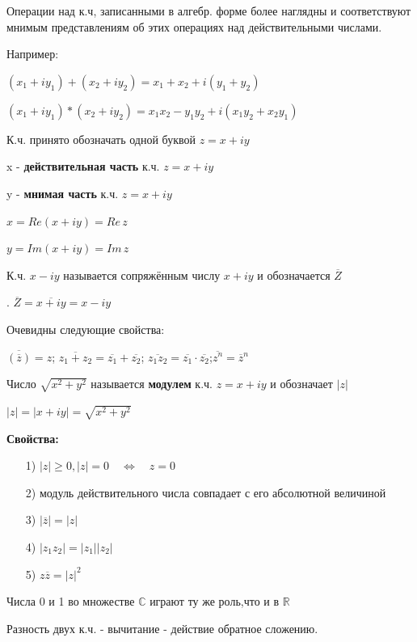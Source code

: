 \documentclass[a4paper, 12pt]{report}
\begin{document}
 Операции над к.ч, записанными в алгебр. форме более наглядны и соответствуют мнимым представлениям об этих операциях над действительными числами. 
  \par\bigskip
 Например:
  \par\bigskip
 \quad \quad $(x_1+iy_1) + (x_2+iy_2) = x_1+x_2+i(y_1+y_2)$
  \par\bigskip
 \quad \quad $(x_1+iy_1)*(x_2+iy_2) = x_1x_2-y_1y_2+i(x_1y_2+x_2y_1)$  
  \par\bigskip
 К.ч. принято обозначать одной буквой $z = x+iy$
\par x - \textbf{действительная часть} к.ч. $z = x+iy$
 \par y - \textbf{мнимая часть} к.ч. $z = x+iy$ 
   \par\bigskip
 \quad \quad $x=Re(x+iy)=Re\, z$
   \par\bigskip
 \quad \quad $y=Im(x+iy)=Im\, z$
   \par\bigskip
 К.ч. $x-iy$ называется сопряжённым числу $x+iy$ и обозначается $\overline{Z}$
   \par\bigskip.
 \quad \quad $\overline{Z} = \overline{x+iy} = x-iy$
    \par\bigskip
 Очевидны следующие свойства:
   \par\bigskip
 \quad \quad $\overline{(\overline{z})} = z$; \quad $\overline{z_1+z_2}=\overline{z_1}+\overline{z_2}$; \quad $\overline{z_1z_2}={\overline{z_1}} \cdot {\overline{z_2}}$;\quad $\overline{z^n}=\overline{z}^n$   
   \par\bigskip
 Число $\sqrt{x^2+y^2}$ называется \textbf{модулем} к.ч. $z=x+iy$ и обозначает $|z|$   
   \par\bigskip
 \quad \quad $|z| = |x+iy| = \sqrt{x^2+y^2}$
   \par\bigskip
 \textbf{Свойства:}
\begin{enumerate}
\item[1)] $|z|\geqslant0, |z|=0 \quad \Longleftrightarrow \quad z=0$
\item[2)] модуль действительного числа совпадает с его абсолютной величиной
\item[3)] $|\overline{z}|=|z|$
\item[4)] $|z_1z_2|=|z_1||z_2|$
\item[5)] $z\overline{z}=|z|^2$
\end{enumerate}
 \par\bigskip Числа 0 и 1 во множестве $\mathbb{C}$ играют ту же роль,что и в $\mathbb{R}$
\par\bigskip
Разность двух к.ч. - вычитание - действие обратное сложению.
\end{document}
